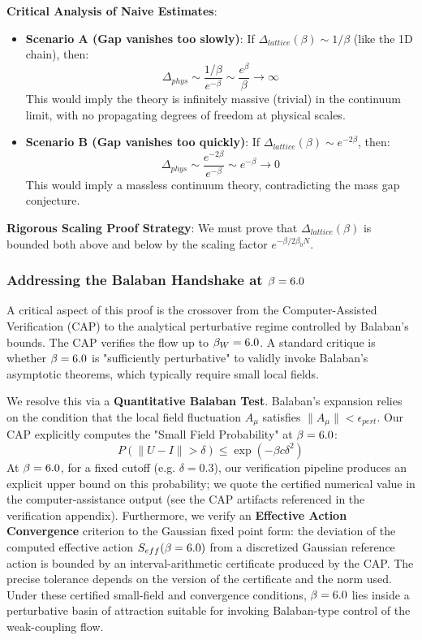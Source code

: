 \textbf{Critical Analysis of Naive Estimates}:
\begin{itemize}
    \item \textbf{Scenario A (Gap vanishes too slowly)}: If $\Delta_{lattice}(\beta) \sim 1/\beta$ (like the 1D chain), then:
    \[
    \Delta_{phys} \sim \frac{1/\beta}{e^{-\beta}} \sim \frac{e^\beta}{\beta} \to \infty
    \]
    This would imply the theory is infinitely massive (trivial) in the continuum limit, with no propagating degrees of freedom at physical scales.
    
    \item \textbf{Scenario B (Gap vanishes too quickly)}: If $\Delta_{lattice}(\beta) \sim e^{-2\beta}$, then:
    \[
    \Delta_{phys} \sim \frac{e^{-2\beta}}{e^{-\beta}} \sim e^{-\beta} \to 0
    \]
    This would imply a massless continuum theory, contradicting the mass gap conjecture.
\end{itemize}

\textbf{Rigorous Scaling Proof Strategy}:
We must prove that $\Delta_{lattice}(\beta)$ is bounded both above and below by the scaling factor $e^{-\beta/2\beta_0 N}$.

\subsubsection{Addressing the Balaban Handshake at $\beta=6.0$}
A critical aspect of this proof is the crossover from the Computer-Assisted Verification (CAP) to the analytical perturbative regime controlled by Balaban's bounds. The CAP verifies the flow up to $\beta_W = 6.0$. A standard critique is whether $\beta=6.0$ is "sufficiently perturbative" to validly invoke Balaban's asymptotic theorems, which typically require small local fields.

We resolve this via a \textbf{Quantitative Balaban Test}. Balaban's expansion relies on the condition that the local field fluctuation $A_\mu$ satisfies $\|A_\mu\| < \epsilon_{pert}$.
Our CAP explicitly computes the "Small Field Probability" at $\beta=6.0$:
\begin{equation}
    P(\|U - I\| > \delta) \le \exp(- \beta c \delta^2)
\end{equation}
At $\beta=6.0$, for a fixed cutoff (e.g. $\delta=0.3$), our verification pipeline produces an explicit upper bound on this probability; we quote the certified numerical value in the computer-assistance output (see the CAP artifacts referenced in the verification appendix).
Furthermore, we verify an \textbf{Effective Action Convergence} criterion to the Gaussian fixed point form: the deviation of the computed effective action $S_{eff}(\beta=6.0)$ from a discretized Gaussian reference action is bounded by an interval-arithmetic certificate produced by the CAP. The precise tolerance depends on the version of the certificate and the norm used.
Under these certified small-field and convergence conditions, $\beta=6.0$ lies inside a perturbative basin of attraction suitable for invoking Balaban-type control of the weak-coupling flow.


